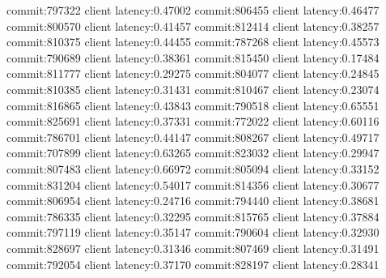 commit:797322 client latency:0.47002
commit:806455 client latency:0.46477
commit:800570 client latency:0.41457
commit:812414 client latency:0.38257
commit:810375 client latency:0.44455
commit:787268 client latency:0.45573
commit:790689 client latency:0.38361
commit:815450 client latency:0.17484
commit:811777 client latency:0.29275
commit:804077 client latency:0.24845
commit:810385 client latency:0.31431
commit:810467 client latency:0.23074
commit:816865 client latency:0.43843
commit:790518 client latency:0.65551
commit:825691 client latency:0.37331
commit:772022 client latency:0.60116
commit:786701 client latency:0.44147
commit:808267 client latency:0.49717
commit:707899 client latency:0.63265
commit:823032 client latency:0.29947
commit:807483 client latency:0.66972
commit:805094 client latency:0.33152
commit:831204 client latency:0.54017
commit:814356 client latency:0.30677
commit:806954 client latency:0.24716
commit:794440 client latency:0.38681
commit:786335 client latency:0.32295
commit:815765 client latency:0.37884
commit:797119 client latency:0.35147
commit:790604 client latency:0.32930
commit:828697 client latency:0.31346
commit:807469 client latency:0.31491
commit:792054 client latency:0.37170
commit:828197 client latency:0.28341